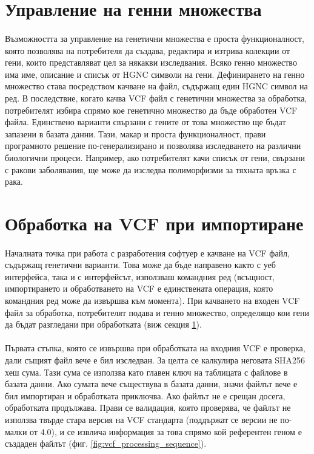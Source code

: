 \documentclass[pdftex,cyrillic,14pt,a4page,twoside,openright]{extreport}
\begin{document}
\section{Управление на генни множества}\label{sec:gene_sets}
\paragraph{}
Възможността за управление на генетични множества е проста функционалност, която позволява на потребителя да създава, редактира и изтрива колекции от гени, които представляват цел за някакви изследвания. Всяко генно множество има име, описание и списък от HGNC символи на гени. Дефинирането на генно множество става посредством качване на файл, съдържащ един HGNC символ на ред. В последствие, когато качва VCF файл с генетични множества за обработка, потребителят избира спрямо кое генетично множество да бъде обработен VCF файла. Единствено варианти свързани с гените от това множество ще бъдат запазени в базата данни. Тази, макар и проста функционалност, прави програмното решение по-генерализирано и позволява изследването на различни биологични процеси. Например, ако потребителят качи списък от гени, свързани с ракови заболявания, ще може да изследва полиморфизми за тяхната връзка с рака.

\section{Обработка на VCF при импортиране}
\paragraph{}
Началната точка при работа с разработения софтуер е качване на VCF файл, съдържащ генетични варианти. Това може да бъде направено както с уеб интерфейса, така и с интерфейсът, използваш командния ред (всъщност, импортирането и обработването на VCF е единствената операция, която командния ред може да извършва към момента). При качването на входен VCF файл за обработка, потребителят подава и генно множество, определящо кои гени да бъдат разгледани при обработката (виж секция \ref{sec:gene_sets}).

\paragraph{}
Първата стъпка, която се извършва при обработката на входния VCF е проверка, дали същият файл вече е бил изследван. За целта се калкулира неговата SHA256 хеш сума. Тази сума се използва като главен ключ на таблицата с файлове в базата данни. Ако сумата вече съществува в базата данни, значи файлът вече е бил импортиран и обработката приключва. Ако файлът не е срещан досега, обработката продължава. Прави се валидация, която проверява, че файлът не използва твърде стара версия на VCF стандарта (поддържат се версии не по-малки от 4.0), и се извлича информация за това спрямо кой референтен геном е създаден файлът (фиг. \ref{fig:vcf_processing_sequence}).
\end{document}
